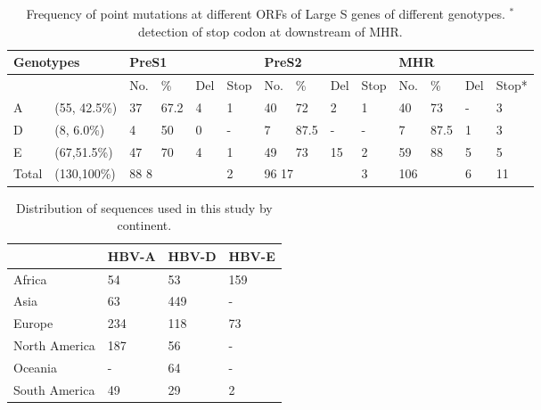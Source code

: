 \begin{sidewaystable}[htp]
    \begin{tabular}{|ll|llll|llll|llll|}
    \hline
    \multicolumn{2}{|l|}{Genotypes} & \multicolumn{4}{l|}{PreS1} & \multicolumn{4}{l|}{PreS2} & \multicolumn{4}{l|}{MHR} \\ \hline
    \multicolumn{1}{|l|}{} &  & \multicolumn{1}{l|}{No.} & \multicolumn{1}{l|}{\%} & \multicolumn{1}{l|}{Del} & Stop & \multicolumn{1}{l|}{No.} & \multicolumn{1}{l|}{\%} & \multicolumn{1}{l|}{Del} & Stop & \multicolumn{1}{l|}{No.} & \multicolumn{1}{l|}{\%} & \multicolumn{1}{l|}{Del} & Stop* \\ \hline
    \multicolumn{1}{|l|}{A} & (55, 42.5\%) & \multicolumn{1}{l|}{37} & \multicolumn{1}{l|}{67.2} & \multicolumn{1}{l|}{4} & 1 & \multicolumn{1}{l|}{40} & \multicolumn{1}{l|}{72} & \multicolumn{1}{l|}{2} & 1 & \multicolumn{1}{l|}{40} & \multicolumn{1}{l|}{73} & \multicolumn{1}{l|}{-} & 3 \\ \hline
    \multicolumn{1}{|l|}{D} & (8, 6.0\%) & \multicolumn{1}{l|}{4} & \multicolumn{1}{l|}{50} & \multicolumn{1}{l|}{0} & - & \multicolumn{1}{l|}{7} & \multicolumn{1}{l|}{87.5} & \multicolumn{1}{l|}{-} & - & \multicolumn{1}{l|}{7} & \multicolumn{1}{l|}{87.5} & \multicolumn{1}{l|}{1} & 3 \\ \hline
    \multicolumn{1}{|l|}{E} & (67,51.5\%) & \multicolumn{1}{l|}{47} & \multicolumn{1}{l|}{70} & \multicolumn{1}{l|}{4} & 1 & \multicolumn{1}{l|}{49} & \multicolumn{1}{l|}{73} & \multicolumn{1}{l|}{15} & 2 & \multicolumn{1}{l|}{59} & \multicolumn{1}{l|}{88} & \multicolumn{1}{l|}{5} & 5 \\ \hline
    \multicolumn{1}{|l|}{Total} & (130,100\%) & \multicolumn{3}{l|}{88                          8} & 2 & \multicolumn{3}{l|}{96                            17} & 3 & \multicolumn{2}{l|}{106} & \multicolumn{1}{l|}{6} & 11 \\ \hline
    \end{tabular}
    \caption{Frequency of point mutations at different ORFs of Large S genes of different genotypes. $^*$detection of stop codon at downstream of MHR.}
    \label{suptab:hbv-s4}
\end{sidewaystable}

\begin{table}[htp]
\begin{tabular}{|l|l|l|l|}
\hline
    & HBV-A & HBV-D & HBV-E \\ \hline
Africa & 54 & 53 & 159 \\ \hline
Asia & 63 & 449 & - \\ \hline
Europe & 234 & 118 & 73 \\ \hline
North America & 187 & 56 & - \\ \hline
Oceania & - & 64 & - \\ \hline
South America & 49 & 29 & 2 \\ \hline
\end{tabular}
\caption{Distribution of sequences used in this study by continent.}
\label{suptab:hbv-s5}
\end{table}

